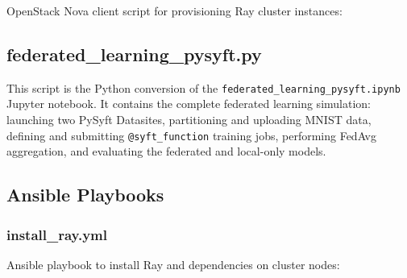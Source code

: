 \documentclass[11pt,a4paper]{article}
\begin{document}
\begin{appendices}
OpenStack Nova client script for provisioning Ray cluster instances:



\subsection{federated\_learning\_pysyft.py}

This script is the Python conversion of the \texttt{federated\_learning\_pysyft.ipynb}
Jupyter notebook. It contains the complete federated learning simulation: launching two
PySyft Datasites, partitioning and uploading MNIST data, defining and submitting
\texttt{@syft\_function} training jobs, performing FedAvg aggregation, and evaluating
the federated and local-only models.



\subsection{Ansible Playbooks}

\subsubsection{install\_ray.yml}

Ansible playbook to install Ray and dependencies on cluster nodes:



\end{appendices}

\end{document}
